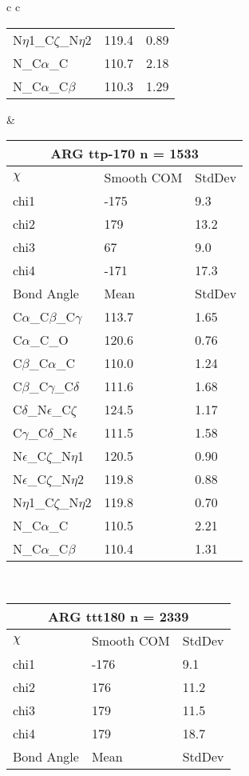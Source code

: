 \begin{longtable}{ c c }
\begin{tabular}{ l l l }
  N$\eta$1\_C$\zeta$\_N$\eta$2 & 119.4 & 0.89\\
  N\_C$\alpha$\_C & 110.7 & 2.18\\
  N\_C$\alpha$\_C$\beta$ & 110.3 & 1.29\\
  \bottomrule
  \end{tabular}
  &
  \begin{tabular}{ l l l }
  \toprule
  \multicolumn{3}{c}{ARG \textbf{ttp-170} n = 1533} \\ \toprule
  $\chi$       & Smooth COM & StdDev \\ \midrule
  chi1 & -175 & 9.3 \\ 
  chi2 & 179 & 13.2 \\ 
  chi3 & 67 & 9.0 \\ 
  chi4 & -171 & 17.3 \\ \midrule
  Bond Angle   & Mean     & StdDev \\ \midrule
  C$\alpha$\_C$\beta$\_C$\gamma$ & 113.7 & 1.65\\
  C$\alpha$\_C\_O & 120.6 & 0.76\\
  C$\beta$\_C$\alpha$\_C & 110.0 & 1.24\\
  C$\beta$\_C$\gamma$\_C$\delta$ & 111.6 & 1.68\\
  C$\delta$\_N$\epsilon$\_C$\zeta$ & 124.5 & 1.17\\
  C$\gamma$\_C$\delta$\_N$\epsilon$ & 111.5 & 1.58\\
  N$\epsilon$\_C$\zeta$\_N$\eta$1 & 120.5 & 0.90\\
  N$\epsilon$\_C$\zeta$\_N$\eta$2 & 119.8 & 0.88\\
  N$\eta$1\_C$\zeta$\_N$\eta$2 & 119.8 & 0.70\\
  N\_C$\alpha$\_C & 110.5 & 2.21\\
  N\_C$\alpha$\_C$\beta$ & 110.4 & 1.31\\
  \bottomrule
  \end{tabular}
  \\
  \begin{tabular}{ l l l }
  \toprule
  \multicolumn{3}{c}{ARG \textbf{ttt180} n = 2339} \\ \toprule
  $\chi$       & Smooth COM & StdDev \\ \midrule
  chi1 & -176 & 9.1 \\ 
  chi2 & 176 & 11.2 \\ 
  chi3 & 179 & 11.5 \\ 
  chi4 & 179 & 18.7 \\ \midrule
  Bond Angle   & Mean     & StdDev \\ \midrule

\end{tabular}
\end{longtable}
